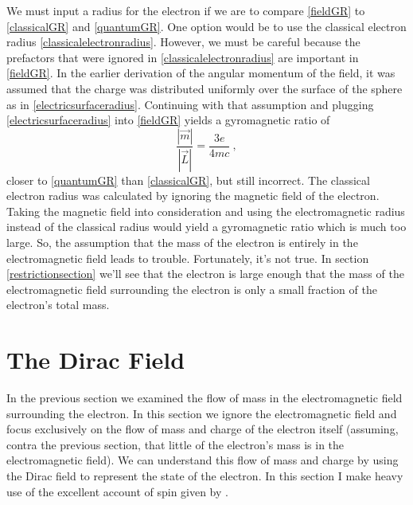 \documentclass[onecolumn,secnumarabic,amsmath,amssymb,balancelastpage,nofootinbib]{article}
\begin{document}
We must input a radius for the electron if we are to compare \eqref{fieldGR} to \eqref{classicalGR} and \eqref{quantumGR}.  One option would be to use the classical electron radius \eqref{classicalelectronradius}.  However, we must be careful because the prefactors that were ignored in \eqref{classicalelectronradius} are important in \eqref{fieldGR}.  In the earlier derivation of the angular momentum of the field, it was assumed that the charge was distributed uniformly over the surface of the sphere as in \eqref{electricsurfaceradius}.  Continuing with that assumption and plugging \eqref{electricsurfaceradius} into \eqref{fieldGR} yields a gyromagnetic ratio of
\begin{equation}
\frac{|\vec{m}|}{|\vec{L}|}=\frac{3 e}{4 m c}\ ,
\label{firstGR}
\end{equation}
closer to \eqref{quantumGR} than \eqref{classicalGR}, but still incorrect.  The classical electron radius was calculated by ignoring the magnetic field of the electron.  Taking the magnetic field into consideration and using the electromagnetic radius instead of the classical radius would yield a gyromagnetic ratio which is much too large.  So, the assumption that the mass of the electron is entirely in the electromagnetic field leads to trouble.  Fortunately, it's not true.  In section \ref{restrictionsection} we'll see that the electron is large enough that the mass of the electromagnetic field surrounding the electron is only a small fraction of the electron's total mass.

\section{The Dirac Field}\label{diracfieldsection}

In the previous section we examined the flow of mass in the electromagnetic field surrounding the electron.  In this section we ignore the electromagnetic field and focus exclusively on the flow of mass and charge of the electron itself (assuming, contra the previous section, that little of the electron's mass is in the electromagnetic field).  We can understand this flow of mass and charge by using the Dirac field to represent the state of the electron.  In this section I make heavy use of the excellent account of spin given by \citet{ohanian}.
\end{document}
